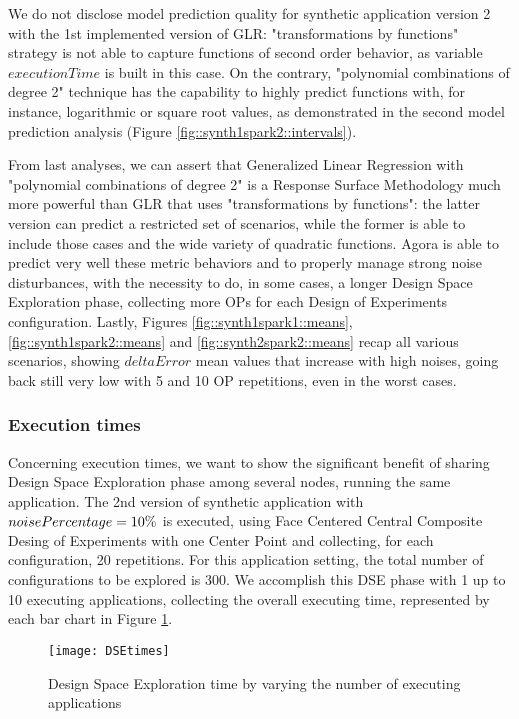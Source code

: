We do not disclose model prediction quality for synthetic application version 2 with the 1st implemented version of GLR: "transformations by functions" strategy is not able to capture functions of second order behavior, as variable $executionTime$ is built in this case. On the contrary, "polynomial combinations of degree 2" technique has the capability to highly predict functions with, for instance, logarithmic or square root values, as demonstrated in the second model prediction analysis (Figure \ref{fig::synth1spark2::intervals}).

From last analyses, we can assert that Generalized Linear Regression with "polynomial combinations of degree 2" is a Response Surface Methodology much more powerful than GLR that uses "transformations by functions": the latter version can predict a restricted set of scenarios, while the former is able to include those cases and the wide variety of quadratic functions. Agora is able to predict very well these metric behaviors and to properly manage strong noise disturbances, with the necessity to do, in some cases, a longer Design Space Exploration phase, collecting more OPs for each Design of Experiments configuration. Lastly, Figures \ref{fig::synth1spark1::means}, \ref{fig::synth1spark2::means} and \ref{fig::synth2spark2::means} recap all various scenarios, showing $deltaError$ mean values that increase with high noises, going back still very low with 5 and 10 OP repetitions, even in the worst cases.


\subsubsection{Execution times}

Concerning execution times, we want to show the significant benefit of sharing Design Space Exploration phase among several nodes, running the same application. The 2nd version of synthetic application with $noise\-Percentage = 10\%$ is executed, using Face Centered Central Composite Desing of Experiments with one Center Point and collecting, for each configuration, 20 repetitions. For this application setting, the total number of configurations to be explored is 300. We accomplish this DSE phase with 1 up to 10 executing applications, collecting the overall executing time, represented by each bar chart in Figure \ref{fig::DSEtimes}.

\begin{figure}[htb]

    \centering
    \texttt{[image: DSEtimes]}
    \caption{Design Space Exploration time by varying the number of executing applications}
    \label{fig::DSEtimes}
    
\end{figure}

